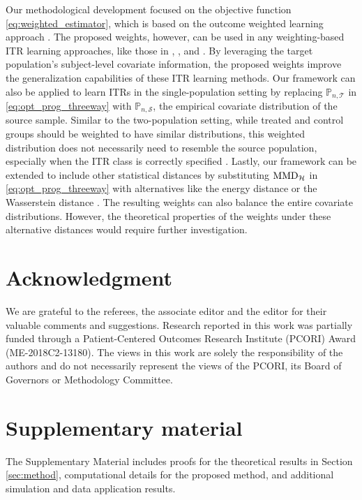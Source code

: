 \documentclass[12pt]{article}
\newcommand{\prob}{\mathbb{P}}
\begin{document}
Our methodological development focused on the objective function \eqref{eq:weighted_estimator}, which is based on the outcome weighted learning approach \citep{zhao2012estimating}. The proposed weights, however, can be used in any weighting-based ITR learning approaches, like those in \citet{wallace2015doubly}, \citet{zhou2017residual}, and \citet{chen2017general}. By leveraging the target population's subject-level covariate information, the proposed weights improve the generalization capabilities of these ITR learning methods. 
Our framework can also be applied to learn ITRs in the single-population setting by replacing $\prob_{n,\mathcal{T}}$ in \eqref{eq:opt_prog_threeway} with $\prob_{n,\mathcal{S}}$, the empirical covariate distribution of the source sample. Similar to the two-population setting, while treated and control groups should be weighted to have similar distributions, this weighted distribution does not necessarily need to resemble the source population, especially when the ITR class is correctly specified \citep{kallus2020more}. 
Lastly, our framework can be extended to include other statistical distances by substituting $\textnormal{MMD}_\mathcal{H}$ in \eqref{eq:opt_prog_threeway} with alternatives like the energy distance \citep{szekely2013energy} or the Wasserstein distance \citep{villani2008optimal}. The resulting weights can also balance the entire covariate distributions. However, the theoretical properties of the weights under these alternative distances would require further investigation.

\section*{Acknowledgment}
We are grateful to the referees, the associate editor and the editor for their valuable comments and suggestions. Research reported in this work was partially funded through a Patient-Centered Outcomes Research Institute (PCORI) Award (ME-2018C2-13180). The views in this work are solely the responsibility of the authors and do not necessarily represent the views of the PCORI, its Board of Governors or Methodology Committee.


\section*{Supplementary material}
The Supplementary Material includes proofs for the theoretical results in Section \ref{sec:method}, computational details for the proposed method, and additional simulation and data application results.
\end{document}

